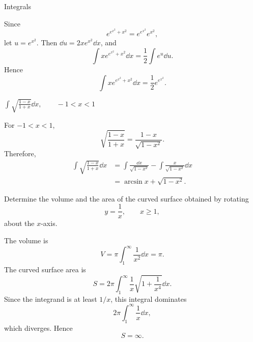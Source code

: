 \begin{expectedproblemgroup}{Integrals}
        \begin{expectedsubsolution}
            Since
            \[
                e^{e^{x^2}+x^2}=e^{e^{x^2}}e^{x^2},
            \]
            let $u=e^{x^2}$. Then $\dd u=2xe^{x^2}\dd x$, and
            \[
                \int x e^{e^{x^2}+x^2}\dd x
                =
                \frac{1}{2}\int e^u\dd u.
            \]
            Hence
            \[
                \boxed{
                    \int x e^{e^{x^2}+x^2}\dd x
                    =
                    \frac{1}{2}e^{e^{x^2}}
                }.
            \]
        \end{expectedsubsolution}

        \begin{expectedsubproblem}
            \(\displaystyle
                \int\sqrt{\frac{1-x}{1+x}}\dd x,
                \qquad -1<x<1
            \)
        \end{expectedsubproblem}

        \begin{expectedsubsolution}
            For $-1<x<1$,
            \[
                \sqrt{\frac{1-x}{1+x}}
                =
                \frac{1-x}{\sqrt{1-x^2}}.
            \]
            Therefore,
            \[
                \begin{aligned}
                    \int\sqrt{\frac{1-x}{1+x}}\dd x
                    &=
                    \int\frac{\dd x}{\sqrt{1-x^2}}
                    -
                    \int\frac{x}{\sqrt{1-x^2}}\dd x\\
                    &=
                    \boxed{\arcsin x+\sqrt{1-x^2}}.
                \end{aligned}
            \]
        \end{expectedsubsolution}

        \begin{expectedsubproblem}
            Determine the volume and the area of the curved surface obtained by
            rotating
            \[
                y=\frac{1}{x},
                \qquad
                x\geq1,
            \]
            about the $x$-axis.
        \end{expectedsubproblem}

        \begin{expectedsubsolution}
            The volume is
            \[
                V
                =
                \pi\int_1^{\infty}\frac{1}{x^2}\dd x
                =
                \boxed{\pi}.
            \]
            The curved surface area is
            \[
                S
                =
                2\pi\int_1^{\infty}
                \frac{1}{x}\sqrt{1+\frac{1}{x^4}}\dd x.
            \]
            Since the integrand is at least $1/x$, this integral dominates
            \[
                2\pi\int_1^{\infty}\frac{1}{x}\dd x,
            \]
            which diverges. Hence
            \[
                \boxed{S=\infty}.
            \]
        \end{expectedsubsolution}


\end{expectedproblemgroup}
